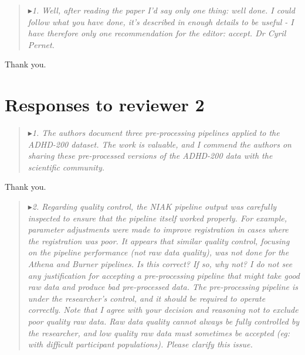 \documentclass[authoryear,3p]{elsarticle}
\begin{document}
\begin{quote}
$\blacktriangleright$\emph{1. Well, after reading the paper I'd say only one thing: well done. I could follow what you have done, it's described in enough details to be useful - I have therefore only one recommendation for the editor: accept.
Dr Cyril Pernet. }
\end{quote}

Thank you.

\section{Responses to reviewer 2}

\begin{quote}
$\blacktriangleright$\emph{1. The authors document three pre-processing pipelines applied to the ADHD-200 dataset. The work is valuable, and I commend the authors on sharing these pre-processed versions of the ADHD-200 data with the scientific community.} 
\end{quote}

Thank you. 

\begin{quote}
$\blacktriangleright$\emph{2. Regarding quality control, the NIAK pipeline output was carefully inspected to ensure that the pipeline itself worked properly. For example, parameter adjustments were made to improve registration in cases where the registration was poor. It appears that similar quality control, focusing on the pipeline performance (not raw data quality), was \emph{not} done for the Athena and Burner pipelines. Is this correct? If so, why not? I do not see any justification for accepting a pre-processing pipeline that might take good raw data and produce bad pre-processed data. The pre-processing pipeline is under the researcher's control, and it should be required to operate correctly. Note that I agree with your decision and reasoning not to exclude poor quality raw data. Raw data quality cannot always be fully controlled by the researcher, and low quality raw data must sometimes be accepted (eg: with difficult participant populations). Please clarify this issue.} 
\end{quote}
\end{document}
